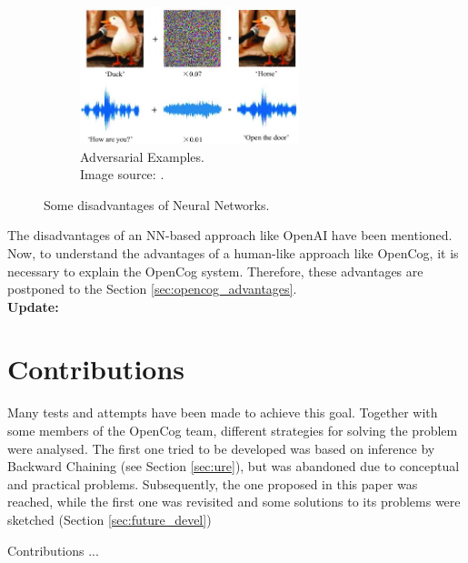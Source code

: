 \begin{figure}
\begin{subfigure}{\linewidth}
	\centering
	\includegraphics[width=0.7\textwidth]{figures/Magistrale/05 - adversarial-examples}
	\caption{Adversarial Examples. \\Image source: \cite{img05}.
	\label{fig:adversarial_examples}}
	\end{subfigure}
\caption{Some disadvantages of Neural Networks.}
\label{fig:disadvantages_nn}
\end{figure} 


The disadvantages of an NN-based approach like OpenAI have been mentioned. Now, to understand the advantages of a human-like approach like OpenCog, it is necessary to explain the OpenCog system. Therefore, these advantages are postponed to the Section \ref{sec:opencog_advantages}. \\

\textbf{Update:}



\section{Contributions}\label{sec:contributions}

Many tests and attempts have been made to achieve this goal. Together with some members of the OpenCog team, different strategies for solving the problem were analysed. The first one tried to be developed was based on inference by Backward Chaining (see Section \ref{sec:ure}), but was abandoned due to conceptual and practical problems. Subsequently, the one proposed in this paper was reached, while the first one was revisited and some solutions to its problems were sketched (Section \ref{sec:future_devel})

Contributions ...
